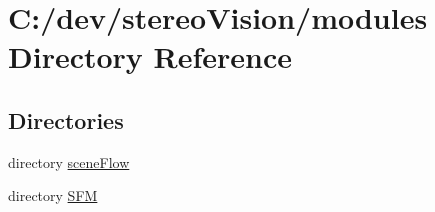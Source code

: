 \section{C\+:/dev/stereo\+Vision/modules Directory Reference}
\label{dir_e05d7e2b1ecd646af5bb94391405f3b5}
\subsection*{Directories}
\begin{DoxyCompactItemize}
\item 
directory \hyperlink{dir_abac25be6e9586a73e0319a6df944064}{scene\+Flow}
\item 
directory \hyperlink{dir_dde556652f18110d5b294adf514896ce}{S\+F\+M}
\end{DoxyCompactItemize}
